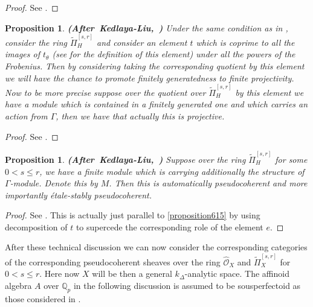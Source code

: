 \documentclass[12pt]{amsart}
\newtheorem{proposition}[theorem]{Proposition}
\theoremstyle{definition}
\numberwithin{equation}{section}
\begin{document}
\begin{proof}
See \cite[Proposition 8.8.9]{KL16}.
\end{proof}



\begin{proposition} \mbox{\bf{(After Kedlaya-Liu, \cite[Corollary 8.8.10]{KL16})}}
Under the same condition as in \cite[Corollary 8.8.10]{KL16}, consider the ring $\widetilde{\Pi}^{[s,r]}_{H}$ and consider an element $t$ which is coprime to all the images of $t_\theta$ (see \cite[Corollary 8.8.10]{KL16} for the definition of this element) under all the powers of the Frobenius. Then by considering taking the corresponding quotient by this element we will have the chance to promote finitely generatedness to finite projectivity. Now to be more precise suppose over the quotient over $\widetilde{\Pi}^{[s,r]}_{H}$ by this element we have a module which is contained in a finitely generated one and which carries an action from $\Gamma$, then we have that actually this is projective.
\end{proposition}

\begin{proof}
See \cite[Corollary 8.8.10]{KL16}.
\end{proof}




\begin{proposition}\mbox{\bf{(After Kedlaya-Liu, \cite[Proposition 8.9.2]{KL16})}} \label{proposition6.20}
Suppose over the ring $\widetilde{\Pi}_H^{[s,r]}$ for some $0<s\leq r$, we have a finite module which is carrying additionally the structure of $\Gamma$-module. Denote this by $M$. Then this is automatically pseudocoherent and more importantly \'etale-stably pseudocoherent.  
\end{proposition}


\begin{proof}
See \cite[Proposition 8.9.2]{KL16}. This is actually just parallel to \cref{proposition615} by using decomposition of $t$ to supercede the corresponding role of the element $e$.	
\end{proof}





\indent After these technical discussion we can now consider the corresponding categories of the corresponding pseudocoherent sheaves over the ring $\widehat{\mathcal{O}}_X$ and $\widetilde{\Pi}_X^{[s,r]}$ for $0<s\leq r$. Here now $X$ will be then a general $k_\Delta$-analytic space. The affinoid algebra $A$ over $\mathbb{Q}_p$ in the following discussion is assumed to be sousperfectoid as those considered in \cite{KH}.
\end{document}
